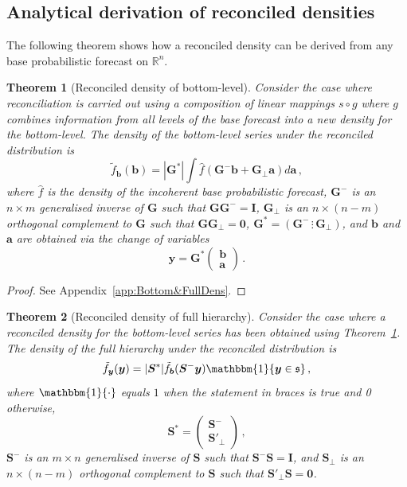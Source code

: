 \documentclass[a4paper,12pt]{article}
\newtheorem{theo}{Theorem}[section]
\theoremstyle{definition}
\begin{document}
\subsection{Analytical derivation of reconciled densities}\label{sec:andens}

The following theorem shows how a reconciled density can be derived from any base probabilistic forecast on $\mathbb{R}^n$.

\begin{theo}[Reconciled density of bottom-level]\label{theo:bottomdens}
	Consider the case where reconciliation is carried out using a composition of linear mappings $s\circ g$ where $g$ combines information from all levels of the base forecast into a new density for the bottom-level. The density of the bottom-level series under the reconciled distribution is
	\[
	\tilde{f}_{\bm{b}}(\bm{b})=|\bm{G}^*|\int \hat{f}(\bm{G}^{-}\bm{b}+\bm{G}_\perp \bm{a})d\bm{a}\,,
	\]
	where $\hat{f}$ is the density of the incoherent base probabilistic forecast, $\bm{G}^-$ is an $n\times m$ generalised inverse of $\bm{G}$ such that $\bm{G}\bm{G}^-=\bm{I}$, $\bm{G}_\perp$ is an $n\times (n-m)$ orthogonal complement to $\bm{G}$ such that $\bm{G}\bm{G}_\perp=\bm{0}$, $\bm{G}^*=\left(\bm{G}^-\,\vdots\,\bm{G}_\perp\right)$, and $\bm{b}$ and $\bm{a}$ are obtained via the change of variables
	\[
	\bm{y}=\bm{G}^*\begin{pmatrix}\bm{b}\\\bm{a}\end{pmatrix}\,.
	\]
\end{theo}

\begin{proof}
	See Appendix~\ref{app:Bottom&FullDens}.
\end{proof}

\begin{theo}[Reconciled density of full hierarchy]\label{theo:fulldens}
	Consider the case where a reconciled density for the bottom-level series has been obtained using Theorem~\ref{theo:bottomdens}. The density of the full hierarchy under the reconciled distribution is
	\[
	\tilde{f}_{\bm{y}}(\bm{y}) =
	|\bm{S}^*| \tilde{f}_{\bm{b}}({\bm{S}^-\bm{y}})
	\mathbbm{1}\{\bm{y}\in\mathfrak{s}\}\,,
	\]
	where $\mathbbm{1}\{\cdot\}$ equals $1$ when the statement in braces is true and 0 otherwise,
	\[
	\bm{S}^*=\begin{pmatrix}
	\bm{S}^-\\
	\bm{S}'_\perp
	\end{pmatrix}\,,
	\]
	$\bm{S}^-$ is an $m\times n$ generalised inverse of $\bm{S}$ such that $\bm{S}^-\bm{S}=\bm{I}$,
	and $\bm{S}_\perp$ is an $n\times (n-m)$ orthogonal complement to $\bm{S}$ such that $\bm{S}'_\perp\bm{S}=\bm{0}$.
\end{theo}
\end{document}
